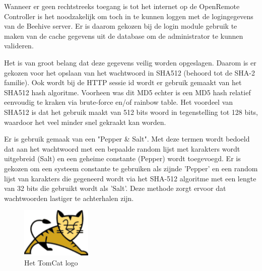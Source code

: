 \documentclass[]{article}
\begin{document}
Wanneer er geen rechtstreeks toegang is tot het internet op de 
OpenRemote Controller is het noodzakelijk om toch in te kunnen loggen met de
logingegevens van de Beehive server. Er is daarom gekozen bij de login module
gebruik te maken van de cache gegevens uit de database om de administrator te
kunnen valideren.

Het is van groot belang dat deze gegevens veilig worden opgeslagen. Daarom is er
gekozen voor het opslaan van het wachtwoord in SHA512 (behoord tot de SHA-2
familie). Ook wordt bij de HTTP sessie id  wordt er gebruik gemaakt van het SHA512
hash algoritme. Voorheen was dit MD5 echter is een MD5 hash relatief
eenvoudig te kraken via brute-force en/of rainbow table. Het voordeel van SHA512
is dat het gebruik maakt van 512 bits woord in tegenstelling tot 128
bits, waardoor het veel minder snel gekraakt kan worden.

Er is gebruik gemaak van een "Pepper \& Salt". Met deze termen wordt bedoeld dat
aan het wachtwoord met een bepaalde random lijst met karakters wordt uitgebreid
(Salt) en een geheime constante (Pepper) wordt toegevoegd. Er is gekozen om een
systeem constante te gebruiken als zijnde 'Pepper' en een random lijst van
karakters die gegeneerd wordt via het SHA-512 algoritme met een lengte van 32
bits die gebruikt wordt als 'Salt'. Deze methode zorgt ervoor dat wachtwoorden
lastiger te achterhalen zijn. 

\begin{figure}
  \begin{center}
    \includegraphics[width=0.30\textwidth]{tomcat.pdf}
  \end{center}
  \caption{Het TomCat logo}
\end{figure}
\end{document}
